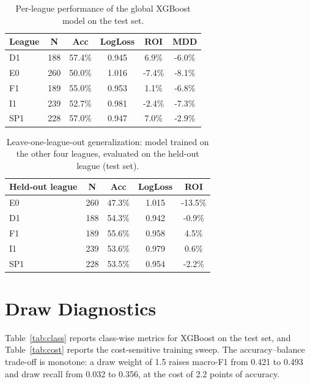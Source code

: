 \documentclass[10pt]{article}
\begin{document}
\begin{table}[H]
\centering
\caption{Per-league performance of the global XGBoost model on the test set.}
\label{tab:league}
\begin{tabular}{lccccc}
\toprule
League & N & Acc & LogLoss & ROI & MDD \\
\midrule
D1 & 188 & 57.4\% & 0.945 & 6.9\% & -6.0\% \\
E0 & 260 & 50.0\% & 1.016 & -7.4\% & -8.1\% \\
F1 & 189 & 55.0\% & 0.953 & 1.1\% & -6.8\% \\
I1 & 239 & 52.7\% & 0.981 & -2.4\% & -7.3\% \\
SP1 & 228 & 57.0\% & 0.947 & 7.0\% & -2.9\% \\
\bottomrule
\end{tabular}
\end{table}

\begin{table}[H]
\centering
\caption{Leave-one-league-out generalization: model trained on the other four
leagues, evaluated on the held-out league (test set).}
\label{tab:lolo}
\small
\begin{tabular}{lcccc}
\toprule
Held-out league & N & Acc & LogLoss & ROI \\
\midrule
E0 & 260 & 47.3\% & 1.015 & -13.5\% \\
D1 & 188 & 54.3\% & 0.942 & -0.9\% \\
F1 & 189 & 55.6\% & 0.958 & 4.5\% \\
I1 & 239 & 53.6\% & 0.979 & 0.6\% \\
SP1 & 228 & 53.5\% & 0.954 & -2.2\% \\
\bottomrule
\end{tabular}
\end{table}

\section{Draw Diagnostics}
\label{app:draw}
Table~\ref{tab:class} reports class-wise metrics for XGBoost on the test set,
and Table~\ref{tab:cost} reports the cost-sensitive training sweep. The
accuracy--balance trade-off is monotone: a draw weight of 1.5 raises macro-F1
from 0.421 to 0.493 and draw recall from 0.032 to 0.356, at the cost of 2.2
points of accuracy.
\end{document}
